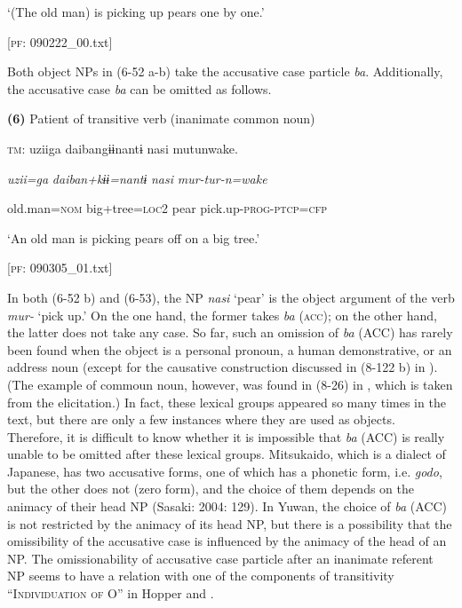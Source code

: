       ‘(The old man) is picking up pears one by one.’

      [\textsc{pf}: 090222\_00.txt]

Both object NPs in (6-52 a-b) take the accusative case particle \textit{ba}. Additionally, the accusative case \textit{ba} can be omitted as follows.

\textbf{(6)}  Patient of transitive verb (inanimate common noun)

  \textsc{tm}:  uziiga  daibangɨɨnantɨ  nasi  mutunwake.

    \textit{uzii=ga}  \textit{daiban+kɨɨ=nantɨ}  \textit{nasi}  \textit{mur-tur-n=wake}

    old.man=\textsc{nom}  big+tree=\textsc{loc}2  pear  pick.up-\textsc{prog}-\textsc{ptcp}=\textsc{cfp}

    ‘An old man is picking pears off on a big tree.’

    [\textsc{pf}: 090305\_01.txt]

In both (6-52 b) and (6-53), the NP \textit{nasi} ‘pear’ is the object argument of the verb \textit{mur-} ‘pick up.’ On the one hand, the former takes \textit{ba} (\textsc{acc}); on the other hand, the latter does not take any case. So far, such an omission of \textit{ba} (ACC) has rarely been found when the object is a personal pronoun, a human demonstrative, or an address noun (except for the causative construction discussed in (8-122 b) in ). (The example of commoun noun, however, was found in (8-26) in , which is taken from the elicitation.) In fact, these lexical groups appeared so many times in the text, but there are only a few instances where they are used as objects. Therefore, it is difficult to know whether it is impossible that \textit{ba} (ACC) is really unable to be omitted after these lexical groups. Mitsukaido, which is a dialect of Japanese, has two accusative forms, one of which has a phonetic form, i.e. \textit{godo}, but the other does not (zero form), and the choice of them depends on the animacy of their head NP (Sasaki: 2004: 129). In Yuwan, the choice of \textit{ba} (ACC) is not restricted by the animacy of its head NP, but there is a possibility that the omissibility of the accusative case is influenced by the animacy of the head of an NP. The omissionability of accusative case particle after an inanimate referent NP seems to have a relation with one of the components of transitivity “I\textsc{ndividuation} \textsc{of} O” in Hopper and \citet[252]{Thompson1980}.

